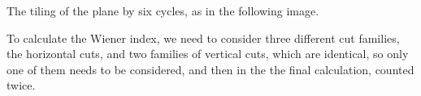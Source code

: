 \documentclass[a4paper]{article}
\begin{document}
The tiling of the plane by six cycles, as in the following image.



\begin{center}
\end{center}

\vspace{10mm}

To calculate the Wiener index, we need to consider three different cut families, the horizontal cuts, and two families of vertical cuts, which are identical, so only one of them needs to be considered, and then in the the final calculation, counted twice.
\end{document}
